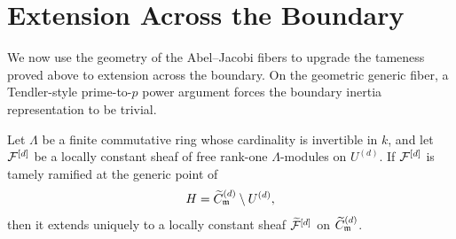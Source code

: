\section{Extension Across the Boundary}\label{section:extension-across-boundary}

We now use the geometry of the Abel--Jacobi fibers to upgrade the tameness
proved above to extension across the boundary. On the geometric generic
fiber, a Tendler-style prime-to-$p$ power argument forces the boundary
inertia representation to be trivial.

\begin{lemma}\label{lemma:ExtensionOfTamelyRamifiedSheaf}
    Let $\Lambda$ be a finite commutative ring whose cardinality is
    invertible in $k$, and let $\mathcal{F}^{[d]}$ be a locally constant sheaf of
    free rank-one $\Lambda$-modules on $U^{(d)}$. If $\mathcal{F}^{[d]}$ is tamely
    ramified at the generic point of
    \[
        H=\widetilde C^{(d)}_{\mathfrak{m}}\setminus U^{(d)},
    \]
    then it extends uniquely to a locally constant sheaf
    $\widetilde{\mathcal{F}}^{[d]}$ on $\widetilde C^{(d)}_{\mathfrak{m}}$.
\end{lemma}

